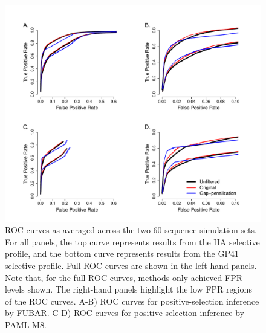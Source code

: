 \documentclass[11pt]{article}
\begin{document}
\begin{figure}[H]
\centerline{\includegraphics[width=6in]{Figures/ROC_prk.pdf}}
\caption{\label{roc} ROC curves as averaged across the two 60 sequence simulation sets. For all panels, the top curve represents results from the HA selective profile, and the bottom curve represents results from the GP41 selective profile. Full ROC curves are shown in the left-hand panels. Note that, for the full ROC curves, methods only achieved FPR levels shown. The right-hand panels highlight the low FPR regions of the ROC curves. A-B) ROC curves for positive-selection inference by FUBAR. C-D) ROC curves for positive-selection inference by PAML M8.}
\end{figure}
\end{document}
